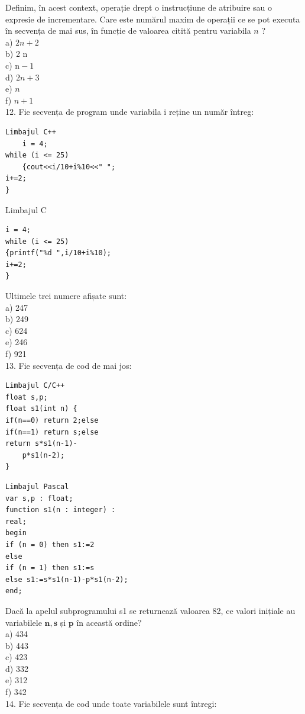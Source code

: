 \documentclass[10pt]{article}
\begin{document}
Definim, în acest context, operație drept o instrucțiune de atribuire sau o expresie de incrementare. Care este numărul maxim de operații ce se pot executa în secvența de mai sus, în funcție de valoarea citită pentru variabila $n$ ?\\
a) $2 n+2$\\
b) 2 n\\
c) $\mathrm{n}-1$\\
d) $2 n+3$\\
e) $n$\\
f) $n+1$\\
12. Fie secvența de program unde variabila i reține un număr întreg:

\begin{verbatim}
Limbajul C++
    i = 4;
while (i <= 25)
    {cout<<i/10+i%10<<" ";
i+=2;
}
\end{verbatim}

Limbajul C

\begin{verbatim}
i = 4;
while (i <= 25)
{printf("%d ",i/10+i%10);
i+=2;
}
\end{verbatim}

Ultimele trei numere afișate sunt:\\
a) 247\\
b) 249\\
c) 624\\
e) 246\\
f) 921\\
13. Fie secvența de cod de mai jos:

\begin{verbatim}
Limbajul C/C++
float s,p;
float s1(int n) {
if(n==0) return 2;else
if(n==1) return s;else
return s*s1(n-1)-
    p*s1(n-2);
}
\end{verbatim}

\begin{verbatim}
Limbajul Pascal
var s,p : float;
function s1(n : integer) :
real;
begin
if (n = 0) then s1:=2
else
if (n = 1) then s1:=s
else s1:=s*s1(n-1)-p*s1(n-2);
end;
\end{verbatim}

Dacă la apelul subprogramului s1 se returnează valoarea 82, ce valori inițiale au variabilele $\mathbf{n}, \mathbf{s}$ și $\mathbf{p}$ în această ordine?\\
a) 434\\
b) 443\\
c) 423\\
d) 332\\
e) 312\\
f) 342\\
14. Fie secvența de cod unde toate variabilele sunt întregi:
\end{document}
